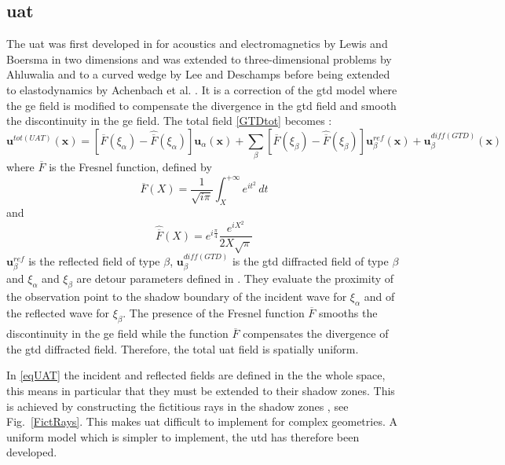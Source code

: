 \subsection{\acrfull{uat}}
The \acrfull{uat} was first developed in for acoustics and electromagnetics by Lewis and Boersma \cite{Lewis} in two dimensions and was extended to three-dimensional problems by Ahluwalia \cite{Ahluwalia} and to a curved wedge by Lee and Deschamps \cite{LeeDeschamps} before being extended to elastodynamics by Achenbach et al. \cite{Achenbach}. It is a correction of the \acrshort{gtd} model where the \acrshort{ge} field is modified to compensate the divergence in the \acrshort{gtd} field and smooth the discontinuity in the \acrshort{ge} field. The total field \eqref{GTDtot} becomes :
\begin{equation}
\mathbf{u}^{tot(UAT)}(\mathbf{x})=\left[ \overline{F}(\xi_{\alpha})-\hat{\overline{F}}(\xi_{\alpha})\right]\mathbf{u}_{\alpha}(\mathbf{x})+\sum_{\beta} \left[ \overline{F}(\xi_{\beta})-\hat{\overline{F}}(\xi_{\beta})\right]\mathbf{u}^{ref}_{\beta}(\mathbf{x})+\mathbf{u}_{\beta}^{diff(GTD)}(\mathbf{x})
\label{eqUAT}
\end{equation}
where $\overline{F}$ is the Fresnel function, defined by 
\begin{equation}
\overline{F}(X)=\frac{1}{\sqrt{i\pi}}\int_X^{+\infty} e^{it^2}\,dt
\label{defFresnel}
\end{equation}
and 
\begin{equation}
\hat{\overline{F}}(X)=e^{i\frac{\pi}{4}}\dfrac{e^{iX^2}}{2X\sqrt{\pi}}
\end{equation}
$\mathbf{u}^{ref}_{\beta}$ is the reflected field of type $\beta$, $\mathbf{u}_{\beta}^{diff(GTD)}$ is the \acrshort{gtd} diffracted field of type $\beta$ and $\xi_{\alpha}$ and $\xi_{\beta}$ are detour parameters defined in \cite{LeeDeschamps}. They evaluate the proximity of the observation point to the shadow boundary of the incident wave for $\xi_{\alpha}$ and of the reflected wave for $\xi_{\beta}$. The presence of the Fresnel function $\overline{F}$ smooths the discontinuity in the \acrshort{ge} field while the function $\hat{\overline{F}}$ compensates the divergence of the \acrshort{gtd} diffracted field. Therefore, the total \acrshort{uat} field is spatially uniform.

In \eqref{eqUAT} the incident and reflected fields are defined in the the whole space, this means in particular that they must be extended to their shadow zones. This is achieved by constructing the fictitious rays in the shadow zones \cite{Bouche,Molinet}, see Fig.~\ref{FictRays}. This makes \acrshort{uat} difficult to implement for complex geometries. A uniform model which is simpler to implement, the \acrfull{utd} has therefore been developed.

